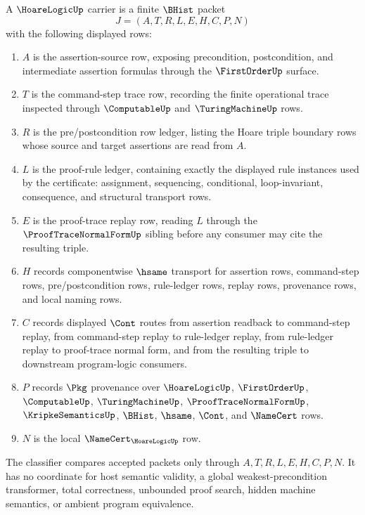 \begin{definition}
\label{def:hoare-logic-carrier}
A $\HoareLogicUp$ carrier is a finite $\BHist$ packet
$$
J=(A,T,R,L,E,H,C,P,N)
$$
with the following displayed rows:
\begin{enumerate}
\item $A$ is the assertion-source row, exposing precondition, postcondition, and intermediate assertion formulas through the $\FirstOrderUp$ surface.
\item $T$ is the command-step trace row, recording the finite operational trace inspected through $\ComputableUp$ and $\TuringMachineUp$ rows.
\item $R$ is the pre/postcondition row ledger, listing the Hoare triple boundary rows whose source and target assertions are read from $A$.
\item $L$ is the proof-rule ledger, containing exactly the displayed rule instances used by the certificate: assignment, sequencing, conditional, loop-invariant, consequence, and structural transport rows.
\item $E$ is the proof-trace replay row, reading $L$ through the $\ProofTraceNormalFormUp$ sibling before any consumer may cite the resulting triple.
\item $H$ records componentwise $\hsame$ transport for assertion rows, command-step rows, pre/postcondition rows, rule-ledger rows, replay rows, provenance rows, and local naming rows.
\item $C$ records displayed $\Cont$ routes from assertion readback to command-step replay, from command-step replay to rule-ledger replay, from rule-ledger replay to proof-trace normal form, and from the resulting triple to downstream program-logic consumers.
\item $P$ records $\Pkg$ provenance over $\HoareLogicUp$, $\FirstOrderUp$, $\ComputableUp$, $\TuringMachineUp$, $\ProofTraceNormalFormUp$, $\KripkeSemanticsUp$, $\BHist$, $\hsame$, $\Cont$, and $\NameCert$ rows.
\item $N$ is the local $\NameCert_{\HoareLogicUp}$ row.
\end{enumerate}
The classifier compares accepted packets only through $A,T,R,L,E,H,C,P,N$. It has no coordinate for host semantic validity, a global weakest-precondition transformer, total correctness, unbounded proof search, hidden machine semantics, or ambient program equivalence.
\end{definition}

